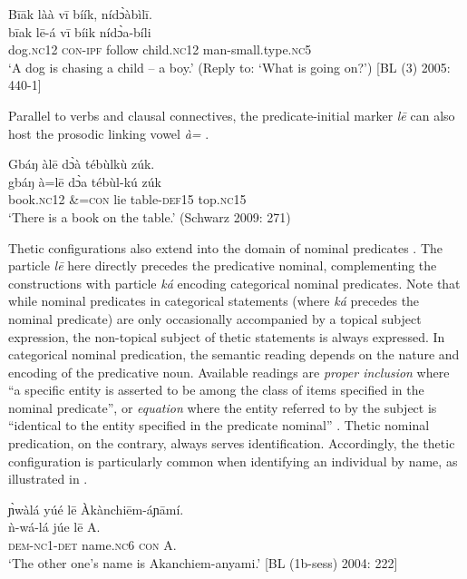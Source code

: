 \documentclass[output=paper]{langsci/langscibook}
\begin{document}
\ea\label{ex:schwarz:15}
\glll  B\={i}\={a}k    làà    v\={i}  bíík,    nídɔ̀àbìl\={i}.\\
    \textup{b\={i}ak}    l\={e}-á    v\={i}  bíik    {nídɔ̀a-bíli}\\
       dog.\textsc{nc}12  \textsc{con}-\textsc{ipf}  follow  child.\textsc{nc}12  man-small.type.\textsc{nc}5\\
\glt ‘A dog is chasing a child – a boy.’ (Reply to: ‘What is going on?’) [BL (3) 2005: 440-1]
\z

Parallel to verbs and clausal connectives, the predicate-initial marker \textit{l\={e}} can also host the prosodic linking vowel \textit{à}\textit{=} .

\ea\label{ex:schwarz:16}
\glll   Gbáŋ    àl\={e}  d\`{ɔ}\`{a} tébùlkù    zúk.\\
    \textup{gbáŋ}    à=l\={e}   d\`{ɔ}a tébùl-kú  {zúk}\\
       book.\textsc{nc}12   \&=\textsc{con}  lie  table-\textsc{def}15  top.\textsc{nc}15\\
\glt ‘There is a book on the table.’ (Schwarz 2009: 271)
\z

Thetic configurations also extend into the domain of nominal predicates . The particle \textit{l\={e}} here directly precedes the predicative nominal, complementing the constructions with particle \textit{ká} encoding categorical nominal predicates. Note that while nominal predicates in categorical statements (where \textit{ká} precedes the nominal predicate) are only occasionally accompanied by a topical subject expression, the non-topical subject of thetic statements is always expressed. In categorical nominal predication, the semantic reading depends on the nature and encoding of the predicative noun. Available readings are \textit{proper inclusion} where “a specific entity is asserted to be among the class of items specified in the nominal predicate”, or \textit{equation} where the entity referred to by the subject is “identical to the entity specified in the predicate nominal” \citep[114]{Payne1997}. Thetic nominal predication, on the contrary, always serves identification. Accordingly, the thetic configuration is particularly common when identifying an individual by name, as illustrated in .

\ea\label{ex:schwarz:17}
\glll   \`ɲw\`al\'a 		y\'u\'e		l\=e 	\`{A}k\`anchi\=em-\'aɲ\={a}m\'i. \\
	\textup{\`n-w\'a-}l\'a  j\'ue		l\=e 	A. \\
	\textsc{dem-nc}1-\textsc{det}	name.\textsc{nc}6	\textsc{con}	A. \\
\glt ‘The other one’s name is Akanchiem-anyami.’ [BL (1b-sess) 2004: 222]
\z 
\end{document}

